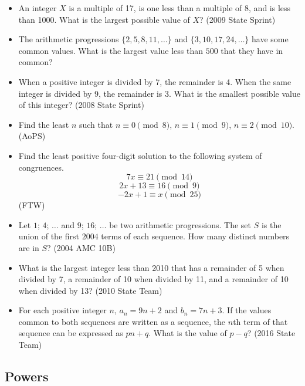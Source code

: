 \documentclass{article}
\begin{document}
\begin{itemize}
\item An integer $X$ is a multiple of 17, is one less than a multiple of 8, and is less than 1000. What is the largest possible value of $X$? (2009 State Sprint)

\item The arithmetic progressions $\{ 2, 5, 8, 11, \ldots\}$ and $\{3, 10, 17, 24, \ldots\}$ have some common values. What is the largest value less than $500$ that they have in common?

\item When a positive integer is divided by 7, the remainder is 4. When the same integer is divided by 9, the remainder is 3. What is the smallest possible value of this integer? (2008 State Sprint)

\item Find the least $n$ such that $n\equiv 0\pmod{8}$, $n\equiv 1\pmod{9}$, $n\equiv 2\pmod{10}$. (AoPS)

\item Find the least positive four-digit solution to the following system of congruences. 
$$7x\equiv 21\pmod{14}$$
$$2x+13\equiv 16\pmod{9}$$
$$-2x+1\equiv x\pmod{25}$$
(FTW)

\item Let $1$; $4$; $\ldots$ and $9$; $16$; $\ldots$ be two arithmetic progressions. The set $S$ is the union of the first $2004$ terms of each sequence. How many distinct numbers are in $S$? (2004 AMC 10B)

\item What is the largest integer less than 2010 that has a remainder of 5 when divided by 7, a remainder of 10 when divided by 11, and a remainder of 10 when divided by 13? (2010 State Team)

\item For each positive integer $n$, $a_n=9n+2$ and $b_n=7n+3$. If the values common to both sequences are written as a sequence, the $n$th term of that sequence can be expressed as $pn+q$. What is the value of $p-q$? (2016 State Team)

\end{itemize}


\subsection{Powers}
\end{document}
